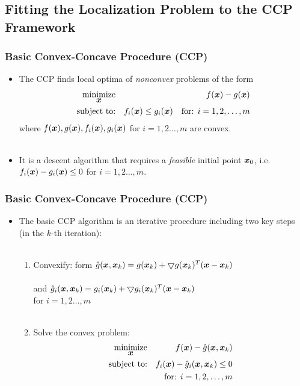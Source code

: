 \documentclass [t] {beamer} %
\begin{document}
\subsection{Fitting the Localization Problem to the CCP Framework}

\begin{frame} %
\frametitle{Basic Convex-Concave Procedure (CCP)} 
\phantom{m}
\begin{itemize}
\item
The CCP finds local optima of \textit{nonconvex} problems of the  form
\begin{eqnarray} \label{eq:5}
 \mathop{\mbox{minimize}}_{\mbox{\boldmath$x$}} & {} & f(\mbox{\boldmath$x$}) - g(\mbox{\boldmath$x$}) \nonumber 
\\ \mbox{subject to:} & {} & f_i(\mbox{\boldmath$x$}) \leq g_i(\mbox{\boldmath$x$}) \quad \mbox{for: }  i = 1, 2, \ldots, m  \nonumber 
\end{eqnarray}
where $f(\mbox{\boldmath$x$}), g(\mbox{\boldmath$x$}) , f_i(\mbox{\boldmath$x$}), g_i(\mbox{\boldmath$x$})$ for $i = 1, 2 \ldots, m$ are convex. 
\\~\\

\item 
It is a descent algorithm that requires a \textit{feasible} initial point $\mbox{\boldmath$x$}_0$, i.e. $f_i(\mbox{\boldmath$x$}) - g_i(\mbox{\boldmath$x$}) \leq 0$ for $i = 1, 2 \ldots, m$.
\end{itemize}
\end{frame}


\begin{frame}  %
\frametitle{Basic Convex-Concave Procedure (CCP)} 
\phantom{m}
\begin{itemize}
\item
 The basic CCP algorithm is an iterative procedure including two key steps (in the $k$-th iteration): \\~\\%
\begin{enumerate}
\item
Convexify: form $\hat{g}(\mbox{\boldmath$x$},\mbox{\boldmath$x$}_k)  =   g(\mbox{\boldmath$x$}_k) +  \bigtriangledown g(\mbox{\boldmath$x$}_k)^T(\mbox{\boldmath$x$} - \mbox{\boldmath$x$}_k) $ \\~\\
 \qquad \qquad  \quad and $\hat{g}_i(\mbox{\boldmath$x$},\mbox{\boldmath$x$}_k)  =   g_i(\mbox{\boldmath$x$}_k) +  \bigtriangledown g_i(\mbox{\boldmath$x$}_k)^T(\mbox{\boldmath$x$} - \mbox{\boldmath$x$}_k) $ \\
 \qquad \qquad \qquad for $ i = 1, 2 \ldots, m $
\\~\\
\item
Solve  the convex problem:
\linespread{0.1}\selectfont
\begin{eqnarray} 
 \mathop{\mbox{minimize}}_{\mbox{\boldmath$x$}} & &  f(\mbox{\boldmath$x$}) - \hat{g}(\mbox{\boldmath$x$}, \mbox{\boldmath$x$}_k) \nonumber
\\ \mbox{subject to:} & &  f_i(\mbox{\boldmath$x$}) -  \hat{g}_i(\mbox{\boldmath$x$}, \mbox{\boldmath$x$}_k) \leq 0   \nonumber
\\ \quad & & \mbox{for: }  i = 1, 2, \ldots, m \nonumber
\end{eqnarray} \\~\\
\linespread{1}\selectfont
\end{enumerate}

\end{itemize}
\end{frame}
\end{document}
